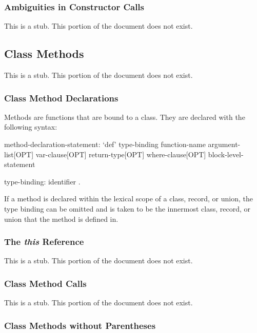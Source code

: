 \subsubsection{Ambiguities in Constructor Calls}
\label{Ambiguities_in_Constructor_Calls}

This is a stub.  This portion of the document does not exist.

\subsection{Class Methods}
\label{Class_Methods}

This is a stub.  This portion of the document does not exist.

\subsubsection{Class Method Declarations}
\label{Class_Method_Declarations}

Methods are functions that are bound to a class.  They are declared
with the following syntax:
\begin{syntax}
method-declaration-statement:
  `def' type-binding function-name argument-list[OPT] var-clause[OPT]
    return-type[OPT] where-clause[OPT] block-level-statement

type-binding:
  identifier .
\end{syntax}

If a method is declared within the lexical scope of a class, record,
or union, the type binding can be omitted and is taken to be the
innermost class, record, or union that the method is defined in.

\subsubsection{The {\em this} Reference}
\label{The_em_this_Reference}

This is a stub.  This portion of the document does not exist.

\subsubsection{Class Method Calls}
\label{Class_Method_Calls}

This is a stub.  This portion of the document does not exist.

\subsubsection{Class Methods without Parentheses}
\label{Class_Methods_without_Parentheses}

